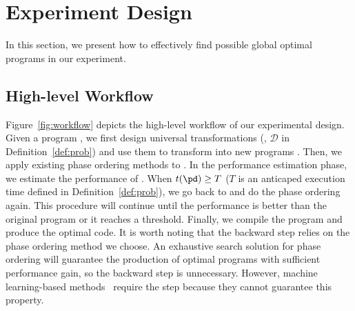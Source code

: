 \section{Experiment Design}

In this section, we present how to effectively find possible global optimal programs in our experiment. 

\subsection{High-level Workflow}
Figure~\ref{fig:workflow} depicts the high-level workflow of our experimental design. Given a program \po{}, we first design universal transformations (\ie, $\mathcal{D}$ in Definition~\ref{def:prob}) and use them to transform \po{} into new programs \pd{}. Then, we apply existing phase ordering methods to \pd{}. In the performance estimation phase, we estimate the performance of \pd{}. When $t(\pd) \geq T$ ($T$ is an anticaped execution time defined in Definition~\ref{def:prob}), we go back to \pd{} and do the phase ordering again. This procedure will continue until the performance is better than the original program or it reaches a threshold.
Finally, we compile the program and produce the optimal code. 
It is worth noting that the backward step relies on the phase ordering method we choose. An exhaustive search solution for phase ordering will guarantee the production of optimal programs with sufficient performance gain, so the backward step is unnecessary. However, machine learning-based methods~\cite{ashouri2017micomp, xx, xx} require the step because they cannot guarantee this property.

